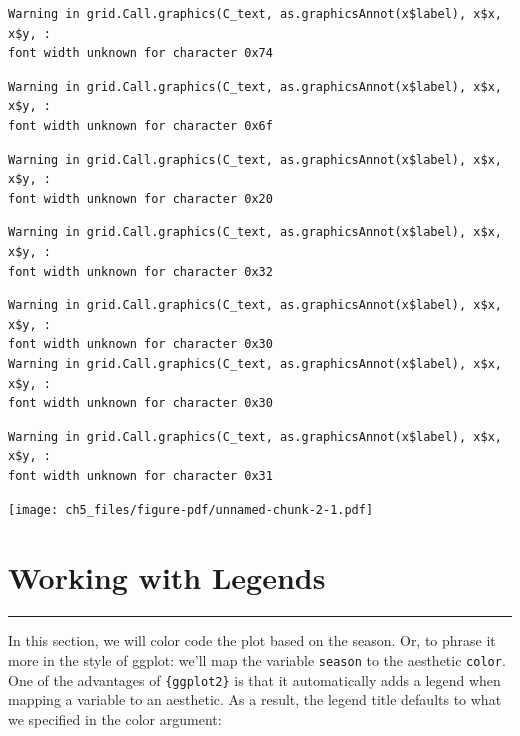\documentclass[
  letterpaper,
]{scrbook}
\begin{document}
\begin{verbatim}
Warning in grid.Call.graphics(C_text, as.graphicsAnnot(x$label), x$x, x$y, :
font width unknown for character 0x74
\end{verbatim}

\begin{verbatim}
Warning in grid.Call.graphics(C_text, as.graphicsAnnot(x$label), x$x, x$y, :
font width unknown for character 0x6f
\end{verbatim}

\begin{verbatim}
Warning in grid.Call.graphics(C_text, as.graphicsAnnot(x$label), x$x, x$y, :
font width unknown for character 0x20
\end{verbatim}

\begin{verbatim}
Warning in grid.Call.graphics(C_text, as.graphicsAnnot(x$label), x$x, x$y, :
font width unknown for character 0x32
\end{verbatim}

\begin{verbatim}
Warning in grid.Call.graphics(C_text, as.graphicsAnnot(x$label), x$x, x$y, :
font width unknown for character 0x30
Warning in grid.Call.graphics(C_text, as.graphicsAnnot(x$label), x$x, x$y, :
font width unknown for character 0x30
\end{verbatim}

\begin{verbatim}
Warning in grid.Call.graphics(C_text, as.graphicsAnnot(x$label), x$x, x$y, :
font width unknown for character 0x31
\end{verbatim}

\texttt{[image: ch5\_files/figure-pdf/unnamed-chunk-2-1.pdf]}


\chapter{Working with Legends}\label{legends}

\begin{center}\rule{0.5\linewidth}{0.5pt}\end{center}

In this section, we will color code the plot based on the season. Or, to
phrase it more in the style of ggplot: we'll map the variable
\texttt{season} to the aesthetic \texttt{color}. One of the advantages
of \texttt{\{ggplot2\}} is that it automatically adds a legend when
mapping a variable to an aesthetic. As a result, the legend title
defaults to what we specified in the color argument:
\end{document}
